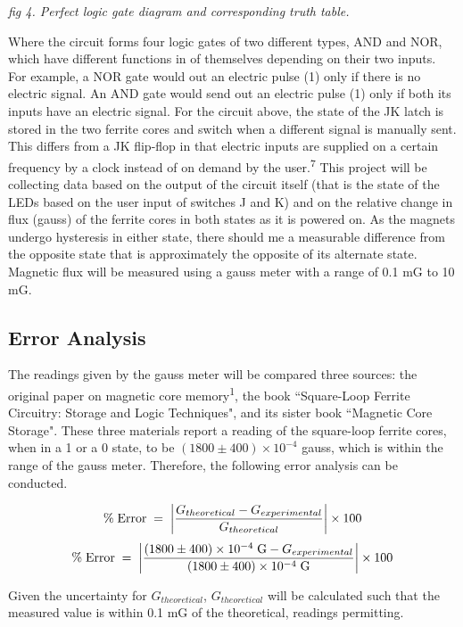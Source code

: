 \documentclass{article}
\begin{document}
\begin{center} 
  \small\emph{fig 4. Perfect logic gate diagram and corresponding truth table.} 
\end{center}

\noindent Where the circuit forms four logic gates of two different types, AND and NOR, which have different functions in of themselves depending on their two inputs. For example, a NOR gate would out an electric pulse (1) only if there is no electric signal. An AND gate would send out an electric pulse (1) only if both its inputs have an electric signal. For the circuit above, the state of the JK latch is stored in the two ferrite cores and switch when a different signal is manually sent. This differs from a JK flip-flop in that electric inputs are supplied on a certain frequency by a clock instead of on demand by the user.\textsuperscript{7}
\newline This project will be collecting data based on the output of the circuit itself (that is the state of the LEDs based on the user input of switches J and K) and on the relative change in flux (gauss) of the ferrite cores in both states as it is powered on. As the magnets undergo hysteresis in either state, there should me a measurable difference from the opposite state that is approximately the opposite of its alternate state. Magnetic flux will be measured using a gauss meter with a range of 0.1 mG to 10 mG.
\subsection*{Error Analysis}
The readings given by the gauss meter will be compared three sources: the original paper on magnetic core memory\textsuperscript{1}, the book ``Square-Loop Ferrite Circuitry: Storage and Logic Techniques", and its sister book ``Magnetic Core Storage". These three materials report a reading of the square-loop ferrite cores, when in a 1 or a 0 state, to be $(1800\pm400) \times 10^{-4}$ gauss, which is within the range of the gauss meter. Therefore, the following error analysis can be conducted.

\[\% \; \mathrm{Error} \; = \; \absolutevalue{\frac{G_{theoretical} - G_{experimental}}{G_{theoretical}}} \times 100\]
\[\% \; \mathrm{Error} \; = \; \absolutevalue{\frac{(1800\pm400) \times 10^{-4} \; \mathrm{G} - G_{experimental}}{(1800\pm400) \times 10^{-4} \; \mathrm{G}}} \times 100\]

\noindent Given the uncertainty for $G_{theoretical}$, $G_{theoretical}$ will be calculated such that the measured value is within 0.1 mG of the theoretical, readings permitting.
\end{document}
